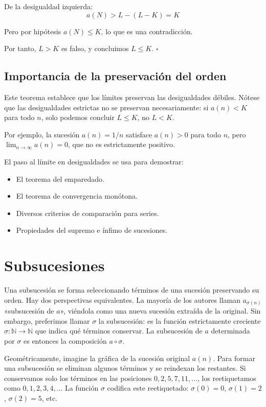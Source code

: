   De la desigualdad izquierda:
  \[
    a(N) > L - (L-K) = K
  \]

  Pero por hipótesis $a(N)\leq K$, lo que es una contradicción.

  Por tanto, $L > K$ es falso, y concluimos $L\leq K$. \hfill$\square$

\subsection{Importancia de la preservación del orden}

Este teorema establece que los límites preservan las desigualdades débiles.
Nótese que las desigualdades estrictas no se preservan necesariamente: si
$a(n)<K$ para todo $n$, solo podemos concluir $L\leq K$, no $L<K$.

Por ejemplo, la sucesión $a(n)=1/n$ satisface $a(n)>0$ para todo $n$, pero
$\lim_{n\to\infty}a(n)=0$, que no es estrictamente positivo.

El paso al límite en desigualdades se usa para demostrar:
\begin{itemize}
  \item El teorema del emparedado.
  \item El teorema de convergencia monótona.
  \item Diversos criterios de comparación para series.
  \item Propiedades del supremo e ínfimo de sucesiones.
\end{itemize}

\section{Subsucesiones}

Una subsucesión se forma seleccionando términos de una sucesión preservando
su orden. Hay dos perspectivas equivalentes. La mayoría de los autores llaman
$a_{\sigma(n)}$ «subsucesión de $a$», viéndola como una nueva sucesión extraída
de la original. Sin embargo, preferimos llamar $\sigma$ la subsucesión: es la
función estrictamente creciente $\sigma:\mathbb{N}\to\mathbb{N}$ que indica qué
términos conservar. La subsucesión de $a$ determinada por $\sigma$ es entonces
la composición $a\circ\sigma$.

Geométricamente, imagine la gráfica de la sucesión original $a(n)$. Para
formar una subsucesión se eliminan algunos términos y se reindexan los
restantes. Si conservamos solo los términos en las posiciones $0, 2, 5, 7, 11,\ldots$,
los reetiquetamos como $0, 1, 2, 3, 4,\ldots$ La función $\sigma$ codifica
este reetiquetado: $\sigma(0)=0$, $\sigma(1)=2$, $\sigma(2)=5$, etc.

